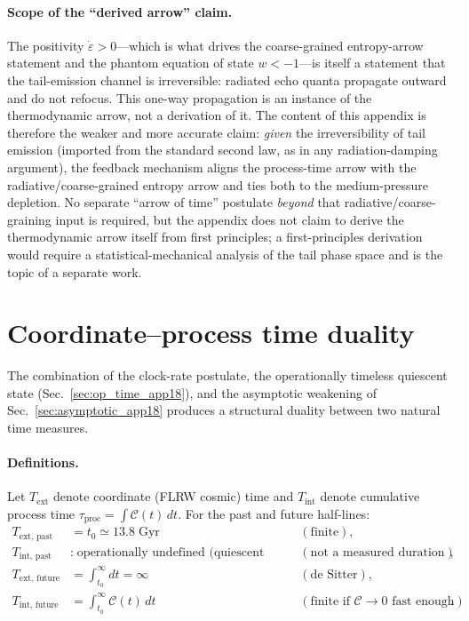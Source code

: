 \documentclass[11pt]{article}
\begin{document}
\paragraph{Scope of the ``derived arrow'' claim.}
The positivity $\dot\varepsilon>0$---which is what drives
the coarse-grained entropy-arrow statement and the phantom
equation of state $w<-1$---is itself a
statement that the tail-emission channel is irreversible: radiated
echo quanta propagate outward and do not refocus.  This one-way
propagation is an instance of the thermodynamic arrow, not a
derivation of it.  The content of this appendix is therefore the
weaker and more accurate claim: \emph{given} the irreversibility of
tail emission (imported from the standard second law, as in any
radiation-damping argument), the feedback mechanism aligns the
process-time arrow with the radiative/coarse-grained entropy arrow
and ties both to the medium-pressure depletion.  No separate
``arrow of time''
postulate \emph{beyond} that radiative/coarse-graining input is
required, but the appendix does not claim to derive the thermodynamic
arrow itself from first principles; a first-principles derivation
would require a statistical-mechanical analysis of the tail phase
space and is the topic of a separate work.

\section{Coordinate--process time duality}
\label{sec:duality_app18}

The combination of the clock-rate postulate, the operationally timeless
quiescent state (Sec.~\ref{sec:op_time_app18}), and the asymptotic
weakening of Sec.~\ref{sec:asymptotic_app18} produces a structural
duality between two natural time measures.

\paragraph{Definitions.}
Let $T_{\mathrm{ext}}$ denote coordinate (FLRW cosmic) time and
$T_{\mathrm{int}}$ denote cumulative process time
$\tau_{\mathrm{proc}}=\int\mathcal{C}(t)\,dt$.  For the past and
future half-lines:
\begin{align}
  T_{\mathrm{ext,\,past}} &= t_0 \simeq 13.8\;\mathrm{Gyr}
    &&(\text{finite}),
  \label{eq:Text_past}\\[4pt]
  T_{\mathrm{int,\,past}} &:\;
    \text{operationally undefined (quiescent medium, no resonant clock)}
    &&(\text{not a measured duration}),
  \label{eq:Tint_past}\\[4pt]
  T_{\mathrm{ext,\,future}} &= \int_{t_0}^{\infty}dt = \infty
    &&(\text{de~Sitter}),
  \label{eq:Text_future}\\[4pt]
  T_{\mathrm{int,\,future}} &= \int_{t_0}^{\infty}\mathcal{C}(t)\,dt
    &&(\text{finite if }\mathcal{C}\to 0\text{ fast enough}).
  \label{eq:Tint_future}
\end{align}
\end{document}
